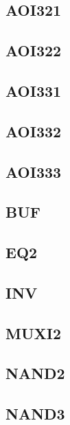 \documentclass[10pt,a4paper,twoside]{article}
\begin{document}
\subsection{AOI321}

\clearpage

\subsection{AOI322}

\clearpage

\subsection{AOI331}

\clearpage

\subsection{AOI332}

\clearpage

\subsection{AOI333}

\clearpage

\subsection{BUF}

\clearpage

\subsection{EQ2}

\clearpage

\subsection{INV}

\clearpage

\subsection{MUXI2}

\clearpage

\subsection{NAND2}

\clearpage

\subsection{NAND3}

\clearpage
\end{document}
